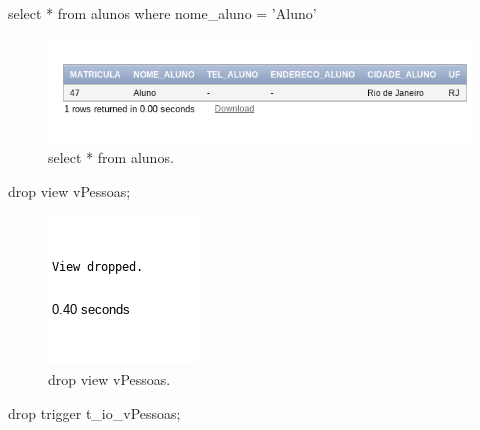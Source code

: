 \documentclass[
article,			%
11pt,				%
oneside,			%
a4paper,			%
english,			%
brazil,				%
sumario=tradicional
]{abntex2}
\begin{document}
\begin{enumerate}
			select * from alunos where nome\_aluno = 'Aluno'
				 \begin{center}
					\begin{figure}[H]
						\centering
						\includegraphics[scale=0.5]{./imagens/26.png}
						\caption{	select * from alunos.}
						\label{rota-1}
					\end{figure}
		    	\end{center}
			drop view vPessoas;
				 \begin{center}
					\begin{figure}[H]
						\centering
						\includegraphics[scale=0.5]{./imagens/28.png}
						\caption{	drop view vPessoas.}
						\label{rota-1}
					\end{figure}
				\end{center}
			drop trigger t\_io\_vPessoas;
			

\end{enumerate}
\end{document}
